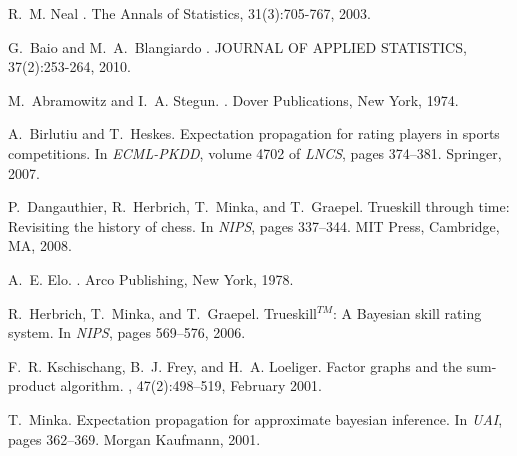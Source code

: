 \begin{thebibliography}{}

%

R.~M. Neal
.
\newblock The Annals of Statistics, 31(3):705-767, 2003.

G.~Baio and M.~A.~Blangiardo
.
\newblock JOURNAL OF APPLIED STATISTICS, 37(2):253-264, 2010.

M.~Abramowitz and I.~A. Stegun.
.
\newblock Dover Publications, New York, 1974.

A.~Birlutiu and T.~Heskes.
\newblock Expectation propagation for rating players in sports competitions.
\newblock In {\em ECML-PKDD}, volume 4702 of {\em LNCS}, pages
  374--381. Springer, 2007.

P.~Dangauthier, R.~Herbrich, T.~Minka, and T.~Graepel.
\newblock Trueskill through time: Revisiting the history of chess.
\newblock In {\em NIPS}, pages 337--344. MIT
  Press, Cambridge, MA, 2008.

A.~E. Elo.
.
\newblock Arco Publishing, New York, 1978.

R.~Herbrich, T.~Minka, and T.~Graepel.
\newblock Trueskill$^{TM}$: A {B}ayesian skill rating system.
\newblock In {\em NIPS}, pages 569--576, 2006.


F.~R. Kschischang, B.~J. Frey, and H.~A. Loeliger.
\newblock Factor graphs and the sum-product algorithm.
, 47(2):498--519,
  February 2001.

T.~Minka.
\newblock Expectation propagation for approximate bayesian inference.
\newblock In {\em UAI}, pages
  362--369. Morgan Kaufmann, 2001.


\end{thebibliography}
